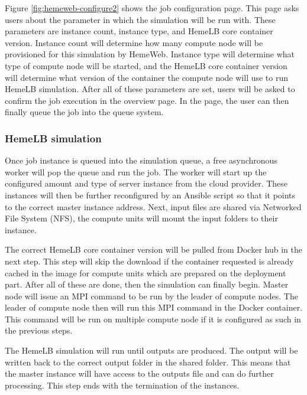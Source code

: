 \vspace{1cm}

Figure \ref{fig:hemeweb-configure2} shows the job configuration page. This page asks users about the parameter in which the simulation will be run with. These parameters are instance count, instance type, and HemeLB core container version. Instance count will determine how many compute node will be provisioned for this simulation by HemeWeb. Instance type will determine what type of compute node will be started, and the HemeLB core container version will determine what version of the container the compute node will use to run HemeLB simulation. After all of these parameters are set, users will be asked to confirm the job execution in the overview page. In the page, the user can then finally queue the job into the queue system.



\subsubsection{HemeLB simulation}

Once job instance is queued into the simulation queue, a free asynchronous worker will pop the queue and run the job. The worker will start up the configured amount and type of server instance from the cloud provider. These instances will then be further reconfigured by an Ansible script so that it points to the correct master instance address. Next, input files are shared via Networked File System (NFS), the compute units will mount the input folders to their instance. 

The correct HemeLB core container version will be pulled from Docker hub in the next step. This step will skip the download if the container requested is already cached in the image for compute units which are prepared on the deployment part. After all of these are done, then the simulation can finally begin. Master node will issue an MPI command to be run by the leader of compute nodes. The leader of compute node then will run this MPI command in the Docker container. This command will be run on multiple compute node if it is configured as such in the previous steps. 

The HemeLB simulation will run until outputs are produced. The output will be written back to the correct output folder in the shared folder. This means that the master instance will have access to the outputs file and can do further processing. This step ends with the termination of the instances.

